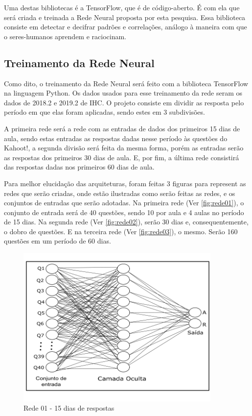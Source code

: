 \documentclass[
	12pt,				%
	openright,			%
	oneside,
	a4paper,			%
	english,			%
	french,				%
	spanish,			%
	brazil,				%
	]{abntex2}
\begin{document}
Uma destas bibliotecas é a TensorFlow, que é de código-aberto. É com ela que será criada e treinada a Rede Neural proposta por esta pesquisa. Essa biblioteca consiste em detectar e decifrar padrões e correlações, análogo à maneira com que o seres-humanos aprendem e raciocinam.

\subsection{Treinamento da Rede Neural}

Como dito, o treinamento da Rede Neural será feito com a biblioteca TensorFlow na linguagem Python. Os dados usados para esse treinamento da rede seram os dados de 2018.2 e 2019.2 de IHC. O projeto consiste em dividir as resposta pelo período em que elas foram aplicadas, sendo estes em 3 subdivisões.

A primeira rede será a rede com as entradas de dados dos primeiros 15 dias de aula, sendo estas entradas as respostas dadas nesse período às questões do Kahoot!, a segunda divisão será feita da mesma forma, porém as entradas serão as respostas dos primeiros 30 dias de aula. E, por fim, a última rede consistirá das respostas dadas nos primeiros 60 dias de aula.

Para melhor elucidação das arquiteturas, foram feitas 3 figuras para represent as redes que serão criadas, onde estão ilustradas como serão feitas as redes, e os conjuntos de entradas que serão adotadas. Na primeira rede (Ver \autoref{fig:rede01}), o conjunto de entrada será de 40 questões, sendo 10 por aula e 4 aulas no período de 15 dias. Na segunda rede (Ver \autoref{fig:rede02}), serão 30 dias e, consequentemente, o dobro de questões. E na terceira rede (Ver \autoref{fig:rede03}), o mesmo. Serão 160 questões em um período de 60 dias.

\begin{figure}
    \centering
    \includegraphics[width=0.9\textwidth]{Modelo_Projeto_Pesquisa_UFG_REJ_BCC/rede01_15.png}
    \caption{Rede 01 - 15 dias de respostas}
    \label{fig:rede01}
\end{figure}
\end{document}
